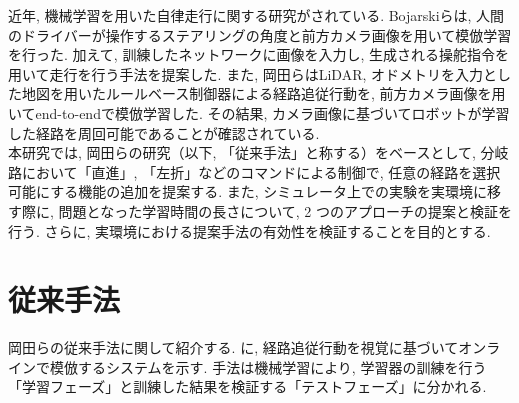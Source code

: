 \documentclass[10pt]{jarticle}
\begin{document}
    近年, 機械学習を用いた自律走行に関する研究がされている. Bojarski\cite{bojarski}らは, 人間のドライバーが操作するステアリングの角度と前方カメラ画像を用いて模倣学習を行った. 加えて, 訓練したネットワークに画像を入力し, 生成される操舵指令を用いて走行を行う手法を提案した. また, 岡田ら\cite{okada}はLiDAR, オドメトリを入力とした地図を用いたルールベース制御器による経路追従行動を, 前方カメラ画像を用いてend-to-endで模倣学習した. その結果, カメラ画像に基づいてロボットが学習した経路を周回可能であることが確認されている. \\本研究では, 岡田ら\cite{okada}の研究（以下, 「従来手法」と称する）をベースとして, 分岐路において「直進」, 「左折」などのコマンドによる制御で, 任意の経路を選択可能にする機能の追加を提案する. また, シミュレータ上での実験を実環境に移す際に, 問題となった学習時間の長さについて, 2 つのアプローチの提案と検証を行う. さらに, 実環境における提案手法の有効性を検証することを目的とする.
    
    
    
    \section{従来手法}%

    岡田らの従来手法に関して紹介する. 
    に, 経路追従行動を視覚に基づいてオンラインで模倣するシステムを示す. 
    手法は機械学習により, 学習器の訓練を行う「学習フェーズ」と訓練した結果を検証する「テストフェーズ」に分かれる. 
\end{document}
